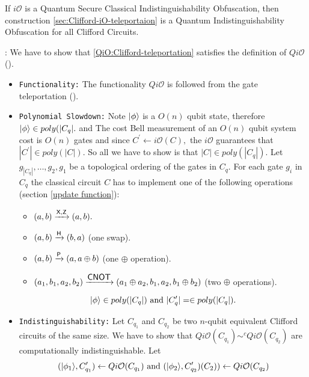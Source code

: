 \begin{theorem}
If $i\mathcal{O}$ is a Quantum Secure Classical Indistinguishability Obfuscation, then construction  \ref{sec:Clifford-iO-teleportaion} is a Quantum Indistinguishability Obfuscation for all Clifford Circuits.
\end{theorem}

: We have to show that \cref{QiO:Clifford-teleportation} satisfies the definition of $Qi\mathcal{O}$ ().
\begin{itemize}
\item  {\tt Functionality:} The functionality $Qi\mathcal{O}$ is followed from the gate teleportation ().
\item {\tt Polynomial Slowdown:} Note ${\lvert}\phi\rangle$ is a $O(n)$ qubit state, therefore ${\lvert}\phi\rangle\in poly(|C_q|.$ and The cost  Bell measurement of an $O(n)$ qubit system cost is $O(n)$ gates and since $C^\prime\leftarrow i\mathcal{O}(C),$ the $i\mathcal{O}$ guarantees that $|C^\prime|\in poly(|C|).$ So all we have to show is that $|C|\in poly(|C_q|).$  Let $g_{|C_q|},\ldots, g_2,g_1$ be a topological ordering of the gates in $C_q.$ For each gate $g_i$ in $C_q$ the classical circuit $C$ has to implement one of the following operations (section \ref{update function}):
 \begin{itemize}
 \item[] $(a,b)\xrightarrow{{\sf X}, {\sf Z}}(a,b).$
 \item[]  $(a,b)\xrightarrow{{\sf H}}(b,a)$         (one swap).
 \item[]  $(a,b)\xrightarrow{{\sf P}}(a,a\oplus b)$      (one $\oplus$ operation).
 \item[]  $(a_1,b_1,a_2,b_2)\xrightarrow{\mbox{{\sf CNOT}}}(a_1\oplus a_2,b_1,a_2, b_1\oplus b_2)$ (two $\oplus$ operations).
 \end{itemize}
\begin{equation*}
{\lvert}\phi\rangle\in poly(|C_q|)    \mbox{ and } |C_q^\prime |= \in poly(|C_q|).
\end{equation*}

\item  {\tt Indistinguishability:} Let $C_{q_1}$ and $C_{q_2}$ be two $n$-qubit equivalent Clifford circuits of the same size. We have to show that $Qi\mathcal{O}(C_{q_1})\sim^c Qi\mathcal{O}(C_{q_2})$ are computationally indistinguishable. Let
\begin{equation*}
\begin{aligned}
({\lvert}\phi_1\rangle ,C_{q_1}^\prime) \leftarrow Qi\mathcal{O}(C_{q_1}) \mbox{ and }
({\lvert}\phi_2\rangle ,C_{q_2}^\prime)(C_2))\leftarrow Qi\mathcal{O}(C_{q_2})
 \end{aligned}
\end{equation*}



\end{itemize}
